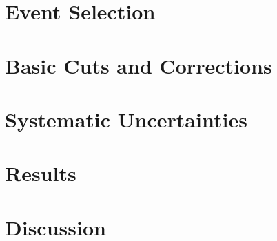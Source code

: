\section{Event Selection }
\label{sec:event_selection}


%

\section{Basic Cuts and Corrections}
\label{sec:cuts_corrections}


\section{Systematic Uncertainties}
\label{sec:systematic}


\section{Results}
\label{sec:results}


\section{Discussion}
\label{sec:discussion}


%
